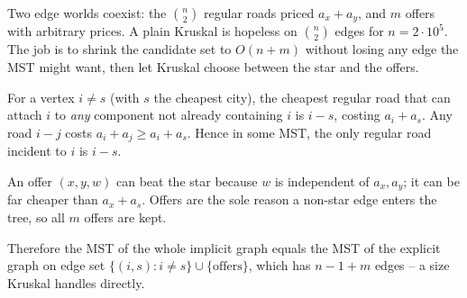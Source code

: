Two edge worlds coexist: the \(\binom n2\) regular roads priced \(a_x+a_y\), and
\(m\) offers with arbitrary prices.  A plain Kruskal is hopeless on
\(\binom n2\) edges for \(n=2\cdot 10^5\).  The job is to shrink the candidate
set to \(O(n+m)\) without losing any edge the MST might want, then let Kruskal
choose between the star and the offers.

\begin{observation}
For a vertex \(i\ne s\) (with \(s\) the cheapest city), the cheapest regular road
that can attach \(i\) to \emph{any} component not already containing \(i\) is
\(i\!-\!s\), costing \(a_i+a_s\).  Any road \(i\!-\!j\) costs \(a_i+a_j\ge
a_i+a_s\).  Hence in some MST, the only regular road incident to \(i\) is \(i\!-\!s\).
\end{observation}
\begin{observation}
An offer \((x,y,w)\) can beat the star because \(w\) is independent of
\(a_x,a_y\); it can be far cheaper than \(a_x+a_s\).  Offers are the sole reason
a non-star edge enters the tree, so all \(m\) offers are kept.
\end{observation}
\begin{observation}
Therefore the MST of the whole implicit graph equals the MST of the explicit
graph on edge set \(\{(i,s): i\ne s\}\cup\{\text{offers}\}\), which has \(n-1+m\)
edges -- a size Kruskal handles directly.
\end{observation}

\begin{thinkbox}
\end{thinkbox}


